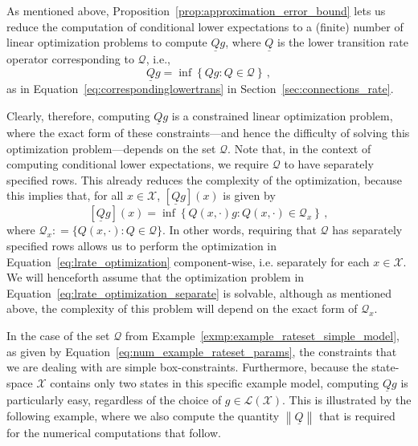 \documentclass[10pt,a4paper]{paper}
\theoremstyle{definition}
\newcommand{\states}{\mathcal{X}}
\newcommand{\gambles}{\mathcal{L}}
\newcommand{\gamblesX}{\gambles(\states)}
\newcommand{\rateset}{\mathcal{Q}}
\newcommand{\lrate}{\underline{Q}}
\newcommand{\norm}[1]{\left\lVert #1 \right\rVert}
\newcommand{\coloneqq}{:\!=}
\begin{document}

As mentioned above, Proposition~\ref{prop:approximation_error_bound} lets us reduce the computation of conditional lower expectations to a (finite) number of linear optimization problems to compute $\lrate g$, where $\lrate$ is the lower transition rate operator corresponding to $\rateset$, i.e.,
\begin{equation}\label{eq:lrate_optimization}
\lrate g = \inf\left\{ Qg : Q\in\rateset \right\}\,,
\end{equation}
as in Equation~\ref{eq:correspondinglowertrans} in Section~\ref{sec:connections_rate}.

Clearly, therefore, computing $\lrate g$ is a constrained linear optimization problem, where the exact form of these constraints---and hence the difficulty of solving this optimization problem---depends on the set $\rateset$. Note that, in the context of computing conditional lower expectations, we require $\rateset$ to have separately specified rows. This already reduces the complexity of the optimization, because this implies that, for all $x\in\states$, $[\lrate g](x)$ is given by
\begin{equation}\label{eq:lrate_optimization_separate}
[\lrate g](x) = \inf\left\{ Q(x,\cdot)g : Q(x,\cdot)\in\rateset_x\right\}\,,
\end{equation}
where $\rateset_x\coloneqq \{Q(x,\cdot) : Q\in\rateset\}$. In other words, requiring that $\rateset$ has separately specified rows allows us to perform the optimization in Equation~\ref{eq:lrate_optimization} component-wise, i.e. separately for each $x\in\states$. We will henceforth assume that the optimization problem in Equation~\ref{eq:lrate_optimization_separate} is solvable, although as mentioned above, the complexity of this problem will depend on the exact form of $\rateset_x$.

In the case of the set $\rateset$ from Example~\ref{exmp:example_rateset_simple_model}, as given by Equation~\eqref{eq:num_example_rateset_params}, the constraints that we are dealing with are simple box-constraints. Furthermore, because the state-space $\states$ contains only two states in this specific example model, computing $\lrate g$ is particularly easy, regardless of the choice of $g\in\gamblesX$. This is illustrated by the following example, where we also compute the quantity $\norm{\lrate}$ that is required for the numerical computations that follow.
\end{document}
